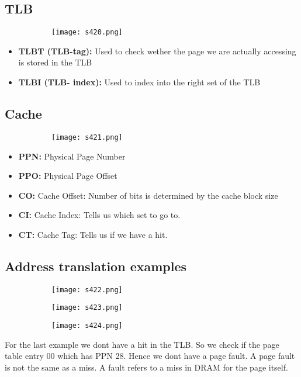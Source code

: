 \documentclass[8pt]{extreport}
\begin{document}
\subsection{TLB}

\begin{figure}[H]
\begin{subfigure}[b]{0.4\linewidth}
\texttt{[image: s420.png]}
\end{subfigure}
\end{figure}

\begin{itemize}
\item \textbf{TLBT (TLB-tag):} Used to check wether the page we are actually accessing is stored in the TLB
\item \textbf{TLBI (TLB- index):} Used to index into the right set of the TLB
\end{itemize}
\subsection{Cache}

\begin{figure}[H]
\begin{subfigure}[b]{0.4\linewidth}
\texttt{[image: s421.png]}
\end{subfigure}
\end{figure}

\begin{itemize}
\item \textbf{PPN:} Physical Page Number
\item \textbf{PPO:} Physical Page Offset
\item \textbf{CO:} Cache Offset: Number of bits is determined by the cache block size
\item \textbf{CI:} Cache Index: Tells us which set to go to.
\item \textbf{CT:} Cache Tag: Tells us if we have a hit.
\end{itemize}

\subsection{Address translation examples}
\begin{figure}[H]
\begin{subfigure}[b]{0.4\linewidth}
\texttt{[image: s422.png]}
\end{subfigure}
\begin{subfigure}[b]{0.4\linewidth}
\texttt{[image: s423.png]}
\end{subfigure}
\begin{subfigure}[b]{0.4\linewidth}
\texttt{[image: s424.png]}
\end{subfigure}
\end{figure}
For the last example we dont have a hit in the TLB. So we check if the page table entry 00 which has PPN 28. Hence we dont have a page fault. A page fault is not the same as a miss. A fault refers to a miss in DRAM for the page itself.
\end{document}

